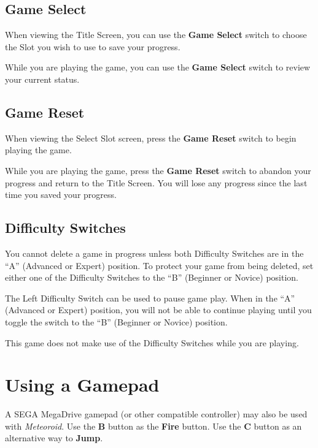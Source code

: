 \documentclass[10pt,twocolumn,openany,article]{memoir}
\begin{document}
\subsection{Game Select}

When  viewing the  Title Screen,  you can  use the  \textbf{Game Select}
switch to choose the Slot you wish to use to save your progress.

While you  are playing the  game, you  can use the  \textbf{Game Select}
switch to review your current status.

\subsection{Game Reset}

When  viewing the  Select  Slot screen,  press  the \textbf{Game  Reset}
switch to begin playing the game.

While you are playing the game,  press the \textbf{Game Reset} switch to
abandon your progress and return to  the Title Screen. You will lose any
progress since the last time you saved your progress.

\subsection{Difficulty Switches}

You cannot delete a game in progress unless both Difficulty Switches are
in the  ``A'' (Advanced or Expert)  position. To protect your  game from
being deleted,  set either one of  the Difficulty Switches to  the ``B''
(Beginner or Novice) position.

\ifdefined\TVSECAM

The Left Difficulty Switch  can be used to pause game  play. When in the
``A'' (Advanced  or Expert) position, you  will not be able  to continue
playing  until  you  toggle  the   switch  to  the  ``B''  (Beginner  or
Novice) position.

\else

This  game does  not  make  use of  the  Difficulty  Switches while  you
are playing. 

\fi

\section{Using a Gamepad}

A   SEGA  \ifdefined{}\fi{}MegaDrive   gamepad  (or   other
compatible controller) may also be used with \textit{Meteoroid}. Use the
\textbf{B} button  as the \textbf{Fire} button.  Use the \textbf{C} button  as an
alternative way to \textbf{Jump}.
\end{document}
